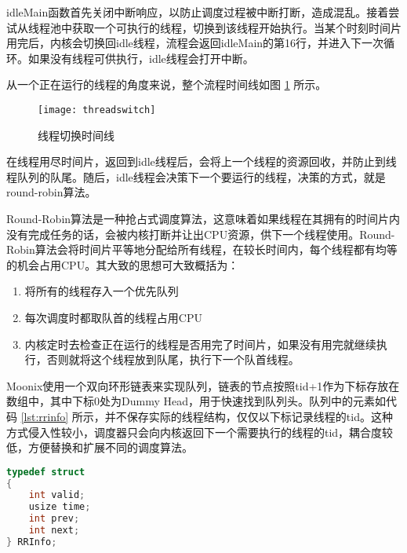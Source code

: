 idleMain函数首先关闭中断响应，以防止调度过程被中断打断，造成混乱。接着尝试从线程池中获取一个可执行的线程，切换到该线程开始执行。当某个时刻时间片用完后，内核会切换回idle线程，流程会返回idleMain的第16行，并进入下一次循环。如果没有线程可供执行，idle线程会打开中断。

从一个正在运行的线程的角度来说，整个流程时间线如图 \ref{pic:threadswitch} 所示。

\begin{figure}[htpb]
	\centering
	\texttt{[image: threadswitch]}
	\setlength{\abovecaptionskip}{2pt}
	\caption{线程切换时间线}
	\label{pic:threadswitch}
\end{figure}

在线程用尽时间片，返回到idle线程后，会将上一个线程的资源回收，并防止到线程队列的队尾。随后，idle线程会决策下一个要运行的线程，决策的方式，就是round-robin算法。

Round-Robin算法是一种抢占式调度算法，这意味着如果线程在其拥有的时间片内没有完成任务的话，会被内核打断并让出CPU资源，供下一个线程使用。Round-Robin算法会将时间片平等地分配给所有线程，在较长时间内，每个线程都有均等的机会占用CPU。其大致的思想可大致概括为：

\begin{enumerate}
	\item 将所有的线程存入一个优先队列
	\item 每次调度时都取队首的线程占用CPU
	\item 内核定时去检查正在运行的线程是否用完了时间片，如果没有用完就继续执行，否则就将这个线程放到队尾，执行下一个队首线程。
\end{enumerate}

Moonix使用一个双向环形链表来实现队列，链表的节点按照tid+1作为下标存放在数组中，其中下标0处为Dummy Head，用于快速找到队列头。队列中的元素如代码 \ref{lst:rrinfo} 所示，并不保存实际的线程结构，仅仅以下标记录线程的tid。这种方式侵入性较小，调度器只会向内核返回下一个需要执行的线程的tid，耦合度较低，方便替换和扩展不同的调度算法。

\begin{minipage}[c]{0.95\textwidth}
\begin{lstlisting}[language={C}, caption={线程调度器元素}, label={lst:rrinfo}]
typedef struct
{
	int valid;
	usize time;
	int prev;
	int next;
} RRInfo;
\end{lstlisting}
\end{minipage}